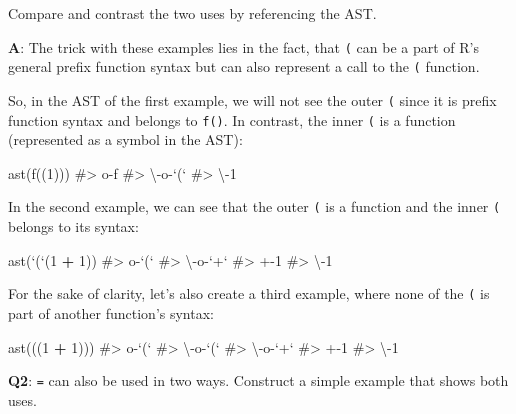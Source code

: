 \documentclass[
]{krantz}
\makeatletter
\newenvironment{Shaded}{\begin{snugshade}}{\end{snugshade}}
\newcommand{\CommentTok}[1]{\textcolor[rgb]{0.56,0.35,0.01}{\textit{#1}}}
\newcommand{\DataTypeTok}[1]{\textcolor[rgb]{0.13,0.29,0.53}{#1}}
\newcommand{\DecValTok}[1]{\textcolor[rgb]{0.00,0.00,0.81}{#1}}
\newcommand{\KeywordTok}[1]{\textcolor[rgb]{0.13,0.29,0.53}{\textbf{#1}}}
\newcommand{\NormalTok}[1]{#1}
\newcommand{\OperatorTok}[1]{\textcolor[rgb]{0.81,0.36,0.00}{\textbf{#1}}}
\newcommand{\StringTok}[1]{\textcolor[rgb]{0.31,0.60,0.02}{#1}}
\newenvironment{kframe}{%
\medskip{}
\setlength{\fboxsep}{.8em}
 \def\at@end@of@kframe{}%
 \ifinner\ifhmode%
  \def\at@end@of@kframe{\end{minipage}}%
  \begin{minipage}{\columnwidth}%
 \fi\fi%
 \def\FrameCommand##1{\hskip\@totalleftmargin \hskip-\fboxsep
 \colorbox{shadecolor}{##1}\hskip-\fboxsep
     \hskip-\linewidth \hskip-\@totalleftmargin \hskip\columnwidth}%
 \MakeFramed {\advance\hsize-\width
   \@totalleftmargin\z@ \linewidth\hsize
   \@setminipage}}%
 {\par\unskip\endMakeFramed%
 \at@end@of@kframe}
\renewenvironment{Shaded}{\begin{kframe}}{\end{kframe}}
\renewcommand{\KeywordTok} [1]{\textcolor[rgb]{0.00,0.44,0.13}{{#1}}}
\renewcommand{\DataTypeTok}[1]{\textcolor[rgb]{0.56,0.13,0.00}{{#1}}}
\renewcommand{\DecValTok}  [1]{\textcolor[rgb]{0.25,0.63,0.44}{{#1}}}
\renewcommand{\StringTok}  [1]{\textcolor[rgb]{0.25,0.44,0.63}{{#1}}}
\renewcommand{\CommentTok} [1]{\textcolor[rgb]{0.38,0.63,0.69}{{#1}}}
\renewcommand{\NormalTok}  [1]{{#1}}
\makeatother
\begin{document}
Compare and contrast the two uses by referencing the AST.

\textbf{{A}}: The trick with these examples lies in the fact, that \texttt{(} can be a part of R's general prefix function syntax but can also represent a call to the \texttt{(} function.

So, in the AST of the first example, we will not see the outer \texttt{(} since it is prefix function syntax and belongs to \texttt{f()}. In contrast, the inner \texttt{(} is a function (represented as a symbol in the AST):

\begin{Shaded}
\begin{Highlighting}[]
\KeywordTok{ast}\NormalTok{(}\KeywordTok{f}\NormalTok{((}\DecValTok{1}\NormalTok{)))}
\CommentTok{#> o-f }
\CommentTok{#> \textbackslash{}-o-`(` }
\CommentTok{#>   \textbackslash{}-1}
\end{Highlighting}
\end{Shaded}

In the second example, we can see that the outer \texttt{(} is a function and the inner \texttt{(} belongs to its syntax:

\begin{Shaded}
\begin{Highlighting}[]
\KeywordTok{ast}\NormalTok{(}\StringTok{`}\DataTypeTok{(}\StringTok{`}\NormalTok{(}\DecValTok{1} \OperatorTok{+}\StringTok{ }\DecValTok{1}\NormalTok{))}
\CommentTok{#> o-`(` }
\CommentTok{#> \textbackslash{}-o-`+` }
\CommentTok{#>   +-1 }
\CommentTok{#>   \textbackslash{}-1}
\end{Highlighting}
\end{Shaded}

For the sake of clarity, let's also create a third example, where none of the \texttt{(} is part of another function's syntax:

\begin{Shaded}
\begin{Highlighting}[]
\KeywordTok{ast}\NormalTok{(((}\DecValTok{1} \OperatorTok{+}\StringTok{ }\DecValTok{1}\NormalTok{)))}
\CommentTok{#> o-`(` }
\CommentTok{#> \textbackslash{}-o-`(` }
\CommentTok{#>   \textbackslash{}-o-`+` }
\CommentTok{#>     +-1 }
\CommentTok{#>     \textbackslash{}-1}
\end{Highlighting}
\end{Shaded}

\textbf{{Q2}}: \texttt{=} can also be used in two ways. Construct a simple example that shows both uses.
\end{document}
